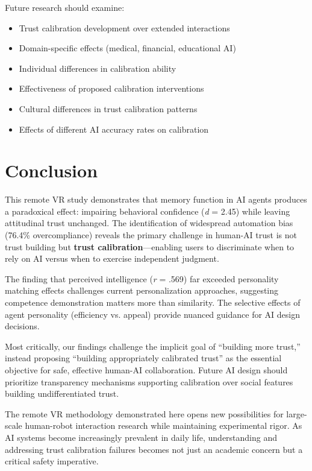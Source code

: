 \documentclass[12pt]{article}
\begin{document}
Future research should examine:
\begin{itemize}
    \item Trust calibration development over extended interactions
    \item Domain-specific effects (medical, financial, educational AI)
    \item Individual differences in calibration ability
    \item Effectiveness of proposed calibration interventions
    \item Cultural differences in trust calibration patterns
    \item Effects of different AI accuracy rates on calibration
\end{itemize}

\section{Conclusion}

This remote VR study demonstrates that memory function in AI agents produces a paradoxical effect: impairing behavioral confidence (\textit{d} = 2.45) while leaving attitudinal trust unchanged. The identification of widespread automation bias (76.4\% overcompliance) reveals the primary challenge in human-AI trust is not trust building but \textbf{trust calibration}---enabling users to discriminate when to rely on AI versus when to exercise independent judgment.

The finding that perceived intelligence (\textit{r} = .569) far exceeded personality matching effects challenges current personalization approaches, suggesting competence demonstration matters more than similarity. The selective effects of agent personality (efficiency vs. appeal) provide nuanced guidance for AI design decisions.

Most critically, our findings challenge the implicit goal of ``building more trust,'' instead proposing ``building appropriately calibrated trust'' as the essential objective for safe, effective human-AI collaboration. Future AI design should prioritize transparency mechanisms supporting calibration over social features building undifferentiated trust.

The remote VR methodology demonstrated here opens new possibilities for large-scale human-robot interaction research while maintaining experimental rigor. As AI systems become increasingly prevalent in daily life, understanding and addressing trust calibration failures becomes not just an academic concern but a critical safety imperative.



\end{document}
